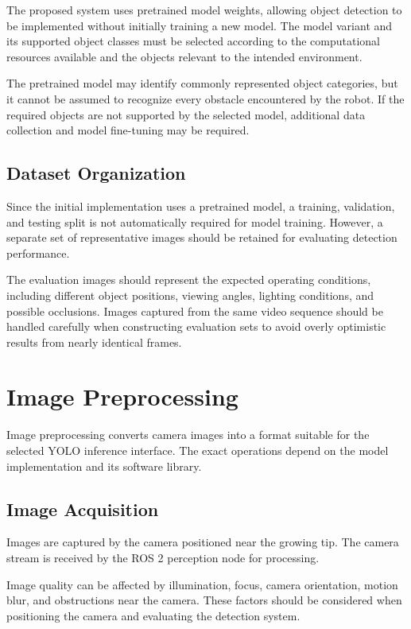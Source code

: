 The proposed system uses pretrained model weights, allowing object detection to be implemented without initially training a new model. The model variant and its supported object classes must be selected according to the computational resources available and the objects relevant to the intended environment.

The pretrained model may identify commonly represented object categories, but it cannot be assumed to recognize every obstacle encountered by the robot. If the required objects are not supported by the selected model, additional data collection and model fine-tuning may be required.

\subsection{Dataset Organization}

Since the initial implementation uses a pretrained model, a training, validation, and testing split is not automatically required for model training. However, a separate set of representative images should be retained for evaluating detection performance.

The evaluation images should represent the expected operating conditions, including different object positions, viewing angles, lighting conditions, and possible occlusions. Images captured from the same video sequence should be handled carefully when constructing evaluation sets to avoid overly optimistic results from nearly identical frames.

\section{Image Preprocessing}

Image preprocessing converts camera images into a format suitable for the selected YOLO inference interface. The exact operations depend on the model implementation and its software library.

\subsection{Image Acquisition}

Images are captured by the camera positioned near the growing tip. The camera stream is received by the ROS 2 perception node for processing.

Image quality can be affected by illumination, focus, camera orientation, motion blur, and obstructions near the camera. These factors should be considered when positioning the camera and evaluating the detection system.

